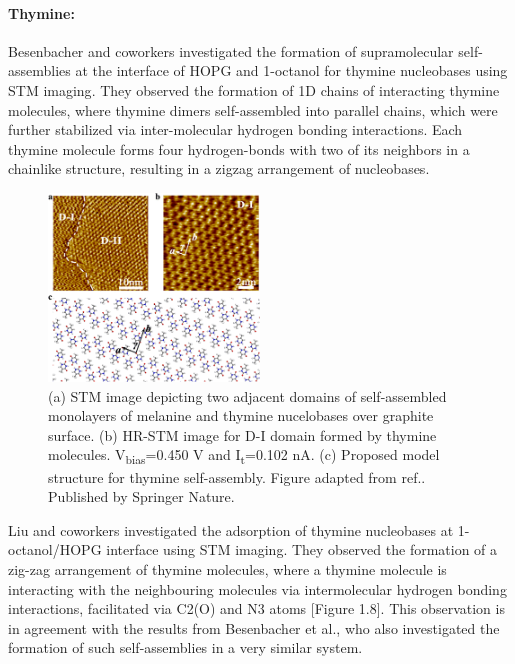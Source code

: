 \paragraph{Thymine:} Besenbacher and coworkers investigated the formation of supramolecular self-assemblies at the interface of HOPG and 1-octanol for thymine nucleobases using STM imaging\supercite{mamdouh_supramolecular_2006}. They observed the formation of 1D chains of interacting thymine molecules, where thymine dimers self-assembled into parallel chains, which were further stabilized via inter-molecular hydrogen bonding interactions. Each thymine molecule forms four hydrogen-bonds with two of its neighbors in a chainlike structure, resulting in a zigzag arrangement of nucleobases.

\begin{figure}
    \centering
    \includegraphics[width=0.5\textwidth]{Introduction/Figures/Figure17.png}
    \caption[STM images for thymine self-assemblies over graphene]{(a) STM image depicting two adjacent domains of self-assembled monolayers of melanine and thymine nucelobases over graphite surface. (b) HR-STM image for D-I domain formed by thymine molecules. V\textsubscript{bias}=0.450 V and I\textsubscript{t}=0.102 nA. (c) Proposed model structure for thymine self-assembly. Figure adapted from ref.\supercite{zhao_investigating_2016}. Published by Springer Nature.}
    \label{fig:figure8}
\end{figure}

Liu and coworkers investigated the adsorption of thymine nucleobases at 1-octanol/HOPG interface using STM imaging.\supercite{zhao_investigating_2016} They observed the formation of a zig-zag arrangement of thymine molecules, where a thymine molecule is interacting with the neighbouring molecules via intermolecular hydrogen bonding interactions, facilitated via C2(O) and N3 atoms [Figure 1.8]. This observation is in agreement with the results from Besenbacher et al., who also investigated the formation of such self-assemblies in a very similar system.\supercite{mamdouh_supramolecular_2006}

